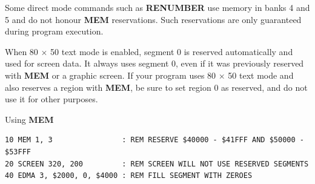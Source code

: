 \begin{description}[leftmargin=2cm,style=nextline]
                  Some direct mode commands such as {\bf RENUMBER} use memory in banks 4 and 5 and do not honour {\bf MEM} reservations. Such reservations are only guaranteed during program execution.

                  When 80 $\times$ 50 text mode is enabled, segment 0 is reserved automatically and used for screen data. It always uses segment 0, even if it was previously reserved with {\bf MEM} or a graphic screen. If your program uses 80 $\times$ 50 text mode and also reserves a region with {\bf MEM}, be sure to set region 0 as reserved, and do not use it for other purposes.

\item [Example:]  Using {\bf MEM}

\begin{tcolorbox}[colback=black,coltext=white]
\verbatimfont{\codefont}
\begin{verbatim}
10 MEM 1, 3                : REM RESERVE $40000 - $41FFF AND $50000 - $53FFF
20 SCREEN 320, 200         : REM SCREEN WILL NOT USE RESERVED SEGMENTS
40 EDMA 3, $2000, 0, $4000 : REM FILL SEGMENT WITH ZEROES
\end{verbatim}
\end{tcolorbox}
\end{description}


\newpage
